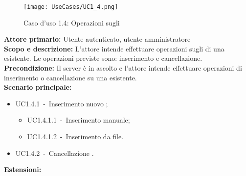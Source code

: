 \documentclass{scalatekids-article}
\begin{document}
\begin{figure}[H]
  \begin{center}
    \texttt{[image: UseCases/UC1\_4.png]}
    \caption{Caso d'uso 1.4: Operazioni sugli }
  \end{center}
\end{figure}
\textbf{Attore primario:} Utente autenticato, utente amministratore\\
\textbf{Scopo e descrizione:} L'attore intende effettuare operazioni sugli  di una  esistente. Le operazioni previste sono:
inserimento e cancellazione.\\
\textbf{Precondizione:} Il server è in ascolto e l'attore intende effettuare operazioni di inserimento o cancellazione su una  esistente.\\
\textbf{Scenario principale:}
\begin{itemize}
\item UC1.4.1\ -\ Inserimento nuovo ;
  \begin{itemize}
  \item UC1.4.1.1\ -\ Inserimento  manuale;
  \item UC1.4.1.2\ -\ Inserimento  da file.
  \end{itemize}
\item UC1.4.2\ -\ Cancellazione .
\end{itemize}
\textbf{Estensioni:}
\end{document}
